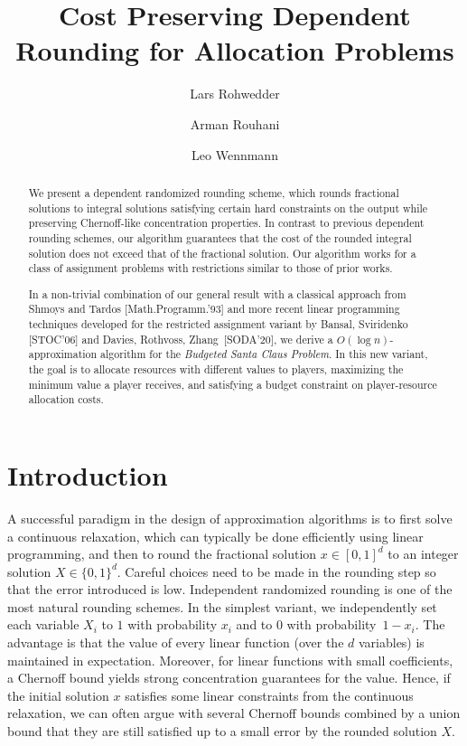\documentclass[a4paper,USenglish,cleveref,thm-restate]{lipics-v2021}
\title{Cost Preserving Dependent Rounding for Allocation Problems}
\author{Lars Rohwedder}{University of Southern Denmark, Odense, Denmark}{rohwedder@sdu.dk}{}{}
\author{Arman Rouhani}{Maastricht University, The Netherlands}{a.rouhani@maastrichtuniversity.nl}{}{}
\author{Leo Wennmann}{University of Southern Denmark, Odense, Denmark}{wennmann@imada.sdu.dk}{}{}
\begin{document}
\maketitle

\begin{abstract}
    We present a dependent randomized rounding scheme, which rounds fractional solutions to integral solutions satisfying certain hard constraints on the output while preserving Chernoff-like concentration properties.
    In contrast to previous dependent rounding schemes, our algorithm guarantees that the cost of the rounded integral solution does not exceed that of the fractional solution.
    Our algorithm works for a class of assignment problems with restrictions similar to those of prior works.

    In a non-trivial combination of our general result with a classical approach from Shmoys and Tardos [Math.\;Programm.'93] and more recent linear programming techniques developed for the restricted assignment variant by Bansal, Sviridenko [STOC'06] and Davies, Rothvoss, Zhang~[SODA'20], we derive a $O(\log n)$-approximation algorithm for the \emph{Budgeted Santa Claus Problem}.
    In this new variant, the goal is to allocate resources with different values to players, maximizing the minimum value a player receives, and satisfying a budget constraint on player-resource allocation costs.
\end{abstract} \section{Introduction}
\label{sec:introduction}
A successful paradigm in the design of approximation algorithms
is to first solve a continuous relaxation, which can
typically be done efficiently using
linear programming, and then to round the 
fractional solution $x\in [0,1]^d$
to an integer solution $X\in\{0,1\}^d$. 
Careful choices need to be made in the rounding step
so that the error introduced is low.
Independent randomized rounding is one of the most natural
rounding schemes. In the simplest variant, we independently
set each variable $X_i$ to $1$ with probability $x_i$ and
to $0$ with probability~$1 - x_i$.
The advantage is that the value of every linear function
(over the $d$ variables) is maintained in expectation.
Moreover, for linear functions with small coefficients,
a Chernoff bound yields strong concentration guarantees
for the value.
Hence, if the initial solution $x$ satisfies some linear 
constraints from the continuous relaxation, we can often
argue with several Chernoff bounds combined by a union bound that 
they are still satisfied up to a small error by the
rounded solution $X$.
\end{document}
